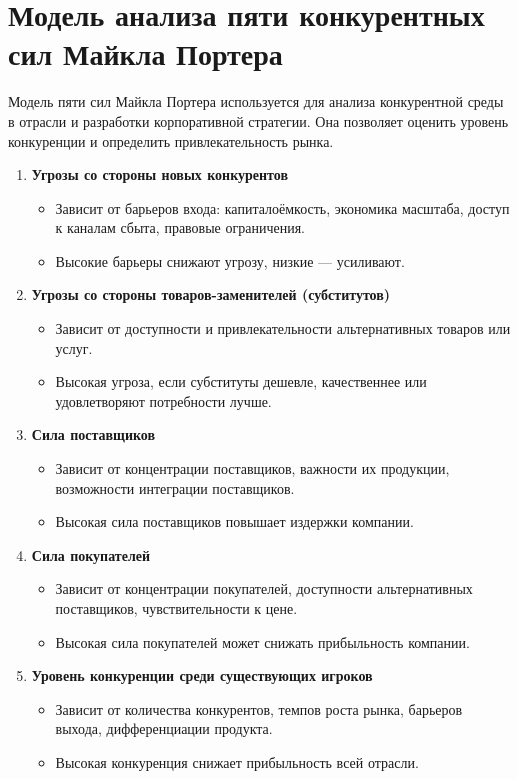 \section*{Модель анализа пяти конкурентных сил Майкла Портера}

Модель пяти сил Майкла Портера используется для анализа конкурентной среды в отрасли и разработки корпоративной стратегии. Она позволяет оценить уровень конкуренции и определить привлекательность рынка.

\begin{enumerate}
    \item \textbf{Угрозы со стороны новых конкурентов}
    \begin{itemize}
        \item Зависит от барьеров входа: капиталоёмкость, экономика масштаба, доступ к каналам сбыта, правовые ограничения.
        \item Высокие барьеры снижают угрозу, низкие --- усиливают.
    \end{itemize}

    \item \textbf{Угрозы со стороны товаров-заменителей (субститутов)}
    \begin{itemize}
        \item Зависит от доступности и привлекательности альтернативных товаров или услуг.
        \item Высокая угроза, если субституты дешевле, качественнее или удовлетворяют потребности лучше.
    \end{itemize}

    \item \textbf{Сила поставщиков}
    \begin{itemize}
        \item Зависит от концентрации поставщиков, важности их продукции, возможности интеграции поставщиков.
        \item Высокая сила поставщиков повышает издержки компании.
    \end{itemize}

    \item \textbf{Сила покупателей}
    \begin{itemize}
        \item Зависит от концентрации покупателей, доступности альтернативных поставщиков, чувствительности к цене.
        \item Высокая сила покупателей может снижать прибыльность компании.
    \end{itemize}

    \item \textbf{Уровень конкуренции среди существующих игроков}
    \begin{itemize}
        \item Зависит от количества конкурентов, темпов роста рынка, барьеров выхода, дифференциации продукта.
        \item Высокая конкуренция снижает прибыльность всей отрасли.
    \end{itemize}
\end{enumerate}


